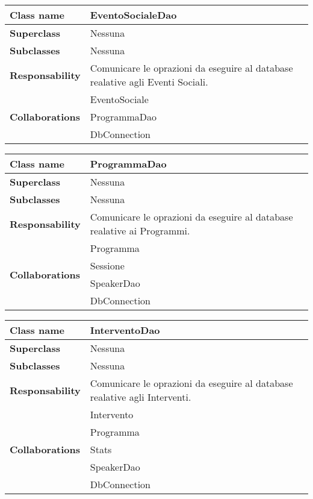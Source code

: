 \begin{table}[h!]
	\begin{tabular}{|l|l|}
		\hline 
		\textbf{Class name} & EventoSocialeDao
		\\ \hline
		\textbf{Superclass} & Nessuna
		\\ \hline
		\multirow{1}{*}{\textbf{Subclasses}} & Nessuna
		\\ \hline
		\textbf{Responsability} & Comunicare le oprazioni da eseguire al database realative agli Eventi Sociali.
		\\ \hline
		\multirow{3}{*}{\textbf{Collaborations}} & EventoSociale \\ 
		& ProgrammaDao \\
		& DbConnection \\ \hline
	\end{tabular}
\end{table}

\begin{table}[h!]
	\begin{tabular}{|l|l|}
		\hline 
		\textbf{Class name} & ProgrammaDao
		\\ \hline
		\textbf{Superclass} & Nessuna
		\\ \hline
		\multirow{1}{*}{\textbf{Subclasses}} & Nessuna
		\\ \hline
		\textbf{Responsability} & Comunicare le oprazioni da eseguire al database realative ai Programmi.
		\\ \hline
		\multirow{4}{*}{\textbf{Collaborations}} & Programma \\ 
		& Sessione \\
		& SpeakerDao \\
		& DbConnection \\ \hline
	\end{tabular}
\end{table}

\begin{table}[h!]
	\begin{tabular}{|l|l|}
		\hline 
		\textbf{Class name} & InterventoDao
		\\ \hline
		\textbf{Superclass} & Nessuna
		\\ \hline
		\multirow{1}{*}{\textbf{Subclasses}} & Nessuna
		\\ \hline
		\textbf{Responsability} & Comunicare le oprazioni da eseguire al database realative agli Interventi.
		\\ \hline
		\multirow{5}{*}{\textbf{Collaborations}} & Intervento \\ 
		& Programma \\
		& Stats \\
		& SpeakerDao \\
		& DbConnection \\ \hline
	\end{tabular}
\end{table}

